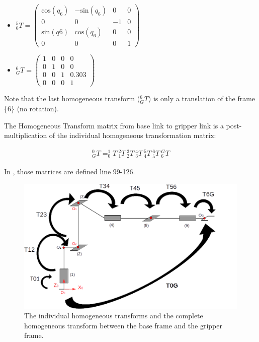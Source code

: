 \documentclass[a4paper,12pt]{report}
\begin{document}
\begin{itemize}
\item $_6 ^5 T = \left( \begin{matrix} \text{cos}(q_6) & -\text{sin}(q_6) & 0 & 0 \\
0 & 0 & -1 & 0 \\
\text{sin}(q6) & \text{cos}(q_6) & 0 & 0 \\
0 & 0 & 0 & 1
 \end{matrix} \right)$

\item $_G ^6 T = \left( \begin{matrix} 1 & 0 & 0 & 0 \\
0 & 1 & 0 & 0 \\
0 & 0 & 1 & 0.303 \\
0 & 0 & 0 & 1
 \end{matrix} \right)$
\end{itemize}

Note that the last homogeneous transform ($_G ^6 T$) is only a translation of the frame \{6\} (no rotation).

The Homogeneous Transform matrix from base link to gripper link is a post-multiplication of the individual homogeneous transformation matrix:

\begin{align}
_G ^0 T = _0 ^1 T \  _1 ^2 T \ _2 ^3 T \ _3 ^4 T \ _4 ^5 T \ _5 ^6 T \ _6 ^G T
\end{align}

In , those matrices are defined line 99-126.
\begin{figure}[H]
\centering
        \includegraphics[totalheight=12cm]{imgs/transform.png}
        \caption{The individual homogeneous transforms and the complete homogeneous transform between the base frame and the gripper frame.}
\end{figure}
\end{document}

